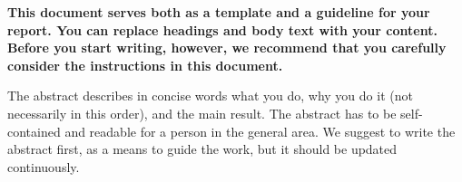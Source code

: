 \textbf{This document serves both as a template and a guideline for your report. You can replace headings and body text with your content. Before you start writing, however, we recommend that you carefully consider the instructions in this document.
}

The abstract describes in concise words what you do, why you do it (not
necessarily in this order), and the main result. The abstract
has to be self-contained and readable for a person in the
general area. We suggest to write the abstract first,
as a means to guide the work, but it should be updated continuously.

